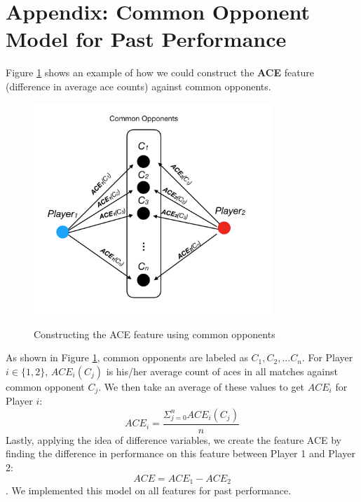 \documentclass[paper=a4, fontsize=11pt]{scrartcl} %
\numberwithin{equation}{section} %
\numberwithin{figure}{section} %
\numberwithin{table}{section} %
\begin{document}
\section{Appendix: Common Opponent Model for Past Performance}
\label{sec:commonopp}
Figure \ref{fig:CO} shows an example of how we could construct the \textbf{ACE} feature (difference in average ace counts) against common opponents. 
\begin{figure}
  \caption{Constructing the ACE feature using common opponents}
  \centering
    \includegraphics[width=0.8\textwidth]{CO}
  \label{fig:CO}
\end{figure}
As shown in Figure \ref{fig:CO}, common opponents are labeled as $C_1, C_2, ...C_n$. For Player $i \in \{1,2\}$, $ACE_i(C_j)$ is his/her average count of aces in all matches against common opponent $C_j$. We then take an average of these values to get $ACE_i$ for Player $i$: $$ACE_i = \frac{\Sigma_{j=0}^n ACE_i(C_j)}{n}$$
Lastly, applying the idea of difference variables, we create the feature ACE by finding the difference in performance on this feature between Player 1 and Player 2: $$ACE = ACE_1 - ACE_2$$.  We implemented this model on all features for past performance.
\end{document}
